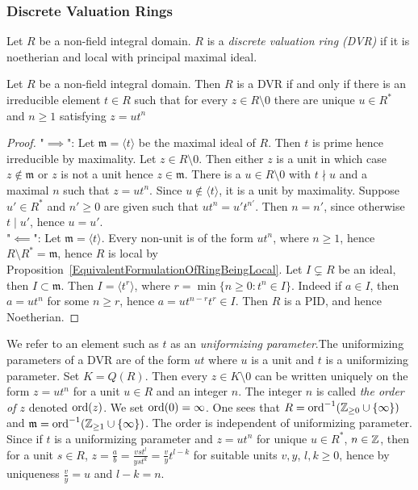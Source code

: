 \subsubsection{Discrete Valuation Rings}
    \begin{definition}
        Let $R$ be a non-field integral domain. $R$ is a \textit{discrete valuation ring (DVR)} if it is noetherian and local with principal maximal ideal. 
    \end{definition}
    \begin{proposition}\label{EquivalentDefinitionOfDVR}
        Let $R$ be a non-field integral domain. Then $R$ is a DVR if and only if there is an irreducible element $t\in R$ such that for every $z\in R\setminus 0$ there are unique $u\in R^\ast$ and $n\geq 1$ satisfying $z=ut^n$
    \end{proposition}
    \begin{proof}
        "$\implies $": Let $\mathfrak{m}=\langle t\rangle$ be the maximal ideal of $R$. Then $t$ is prime hence irreducible by maximality. Let $z\in R\setminus0$. Then either $z$ is a unit in which case $z\notin \mathfrak{m}$ or $z$ is not a unit hence $z\in\mathfrak{m}$. There is a $u\in R\setminus 0$ with $t\nmid u$ and a maximal $n$ such that $z=ut^n$. Since $u\notin \langle t\rangle$, it is a unit by maximality. Suppose $u'\in R^\ast $ and $n'\geq0$ are given such that $ut^n = u't^{n'}$. Then $n=n'$, since otherwise $t\mid u'$, hence $u=u'$.\\
        "$\impliedby$": Let $\mathfrak{m}=\langle t\rangle$. Every non-unit is of the form $ut^n$, where $n\geq 1$, hence $R\setminus R^\ast = \mathfrak{m}$, hence $R$ is local by Proposition~\ref{EquivalentFormulationOfRingBeingLocal}. Let $I\subsetneq R$ be an ideal, then $I\subset \mathfrak{m}$. Then $I=\langle t^r\rangle$, where $r=\min \{n\geq 0: t^n\in I\}.$ Indeed if $a\in I$, then $a=ut^n$ for some $n\geq r$, hence $a=ut^{n-r}t^{r}\in I$. Then $R$ is a PID, and hence Noetherian.   
    \end{proof}
    \begin{remark}
        We refer to an element such as $t$ as an \textit{uniformizing parameter}.The uniformizing parameters of a DVR are of the form $ut$ where $u$ is a unit and $t$ is a uniformizing parameter. Set $K=Q(R)$. Then every $z\in K\setminus0$ can be written uniquely on the form $z=ut^{n}$ for a unit $u\in R$ and an integer $n$. The integer $n$ is called \textit{the order of $z$} denoted $\mathrm{ord}(z)$. We set $\mathrm{ord}(0)=\infty$. One sees that $R=\mathrm{ord}^{-1}(\mathbb{Z}_{\geq 0}\cup\{\infty\})$ and $\mathfrak{m}=\mathrm{ord}^{-1}(\mathbb{Z}_{\geq 1}\cup\{\infty\})$. The order is independent of uniformizing parameter. Since if $t$ is a uniformizing parameter and $z = ut^n$ for unique $u\in R^\ast$, $n\in \mathbb{Z}$, then for a unit $s\in R$, $z= \frac{a}{b} = \frac{vst^l}{yst^k} = \frac{v}{y}t^{l-k}$ for suitable units $v,y$, $l,k\geq 0$, hence by uniqueness $\frac{v}{y}=u$ and $l-k=n$.   
    \end{remark}
